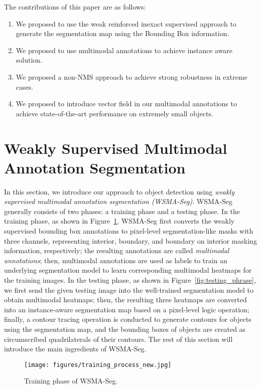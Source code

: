 \documentclass{article}
\begin{document}
{The contributions of this paper are as follows:
\begin{enumerate}
  \item We proposed to use the weak reinforced inexact supervised approach to generate the segmentation map using the Bounding Box information.
  \item We proposed to use multimodal annotations to achieve instance aware solution.
  \item We proposed a non-NMS approach to achieve strong robustness in extreme cases.
  \item We proposed to introduce vector field in our multimodal annotations to achieve state-of-the-art performance on extremely small objects.
\end{enumerate}
}

\section{Weakly Supervised Multimodal Annotation Segmentation}



In this section, we introduce our approach to object detection using \emph{weakly supervised multimodal annotation segmentation (WSMA-Seg)}. WSMA-Seg generally consists of two phases: a training phase and a testing phase. In the training phase, as shown in Figure~\ref{fig:training_phrase}, WSMA-Seg first converts the weakly supervised bounding box annotations to pixel-level segmentation-like masks with three channels, representing interior, boundary, and boundary on interior masking information, respectively; the resulting annotations are called \emph{multimodal annotations}; then, multimodal annotations are used as labels to train an underlying segmentation model to learn corresponding multimodal heatmaps for the training images. In the testing phase, as shown in Figure~\ref{fig:testing_phrase}, we first send the given testing image into the well-trained segmentation model to obtain multimodal heatmaps; then, the resulting three heatmaps are converted into an instance-aware segmentation map based on a pixel-level logic operation; finally, a contour tracing operation is conducted to generate contours for objects using the segmentation map, and the bounding boxes of objects are created as circumscribed quadrilaterals of their contours. The rest of this section will introduce the main ingredients of WSMA-Seg. 


\begin{figure}[!t]
  \centering
     \texttt{[image: figures/training\_process\_new.jpg]}
     \caption{Training phase of WSMA-Seg.\label{fig:training_phrase}}
\end{figure}
\end{document}
